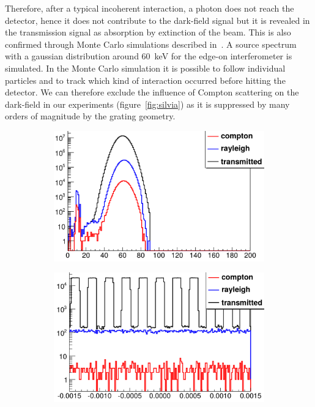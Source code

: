 Therefore, after a typical incoherent interaction, a photon does not reach
the detector, hence it does not contribute to the dark-field signal but it
is revealed in the transmission signal as absorption by extinction of the
beam. This is also confirmed through Monte Carlo simulations described
in~\cite{silviathesis}. A source spectrum with a gaussian distribution
around \SI{60}{\kilo\eV} for the edge-on interferometer is simulated. In the
Monte Carlo simulation it is possible to follow individual particles and to
track which kind of interaction occurred before hitting the detector.
We can therefore exclude the influence of Compton scattering on the
dark-field in our experiments (figure~\ref{fig:silvia}) as it is suppressed
by many orders of magnitude by the grating geometry.

\begin{figure}[htb]
    \centering
    \begin{subfigure}[b]{.49\textwidth}
    \centering
    \includegraphics[width=\textwidth]{gfx/compton/scattering_monte_carlo_energy.png}
    \caption{}
    \end{subfigure}
    \begin{subfigure}[b]{.49\textwidth}
    \centering
    \includegraphics[width=\textwidth]{gfx/compton/scattering_monte_carlo_position.png}

\end{subfigure}
\end{figure}
